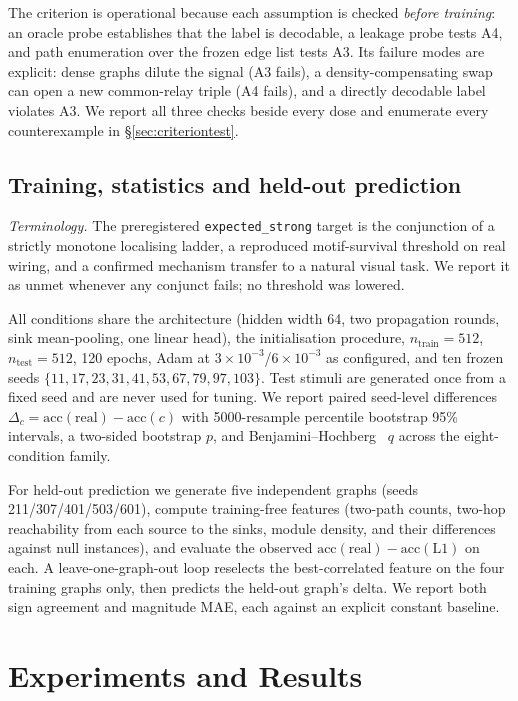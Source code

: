 \documentclass[10pt,twocolumn,letterpaper]{article}
\begin{document}
The criterion is operational because each assumption is checked
\emph{before training}: an oracle probe establishes that the label is
decodable, a leakage probe tests A4, and path enumeration over the frozen edge
list tests A3. Its failure modes are explicit: dense graphs dilute the signal
(A3 fails), a density-compensating swap can open a new common-relay triple
(A4 fails), and a directly decodable label violates A3. We report all three
checks beside every dose and enumerate every counterexample in
\S\ref{sec:criteriontest}.

\subsection{Training, statistics and held-out prediction}
\label{sec:protocol}

\emph{Terminology.} The preregistered \texttt{expected\_strong} target is the
conjunction of a strictly monotone localising ladder, a reproduced
motif-survival threshold on real wiring, and a confirmed mechanism transfer
to a natural visual task. We report it as unmet whenever any conjunct fails;
no threshold was lowered.

All conditions share the architecture (hidden width 64, two propagation
rounds, sink mean-pooling, one linear head), the initialisation procedure,
$n_{\text{train}}=512$, $n_{\text{test}}=512$, 120 epochs, Adam at
$3\!\times\!10^{-3}$/$6\!\times\!10^{-3}$ as configured, and ten frozen seeds
$\{11,17,23,31,41,53,67,79,97,103\}$. Test stimuli are generated once from a
fixed seed and are never used for tuning. We report paired seed-level
differences $\Delta_c = \mathrm{acc}(\text{real}) - \mathrm{acc}(c)$ with
5000-resample percentile bootstrap 95\% intervals, a two-sided bootstrap $p$,
and Benjamini--Hochberg~\cite{benjamini1995} $q$ across the eight-condition family.

For held-out prediction we generate five independent graphs (seeds
211/307/401/503/601), compute training-free features (two-path counts,
two-hop reachability from each source to the sinks, module density, and their
differences against null instances), and evaluate the observed
$\mathrm{acc}(\text{real})-\mathrm{acc}(\text{L1})$ on each. A
leave-one-graph-out loop reselects the best-correlated feature on the four
training graphs only, then predicts the held-out graph's delta. We report both
sign agreement and magnitude MAE, each against an explicit constant baseline.

\section{Experiments and Results}
\label{sec:exp}
\end{document}
